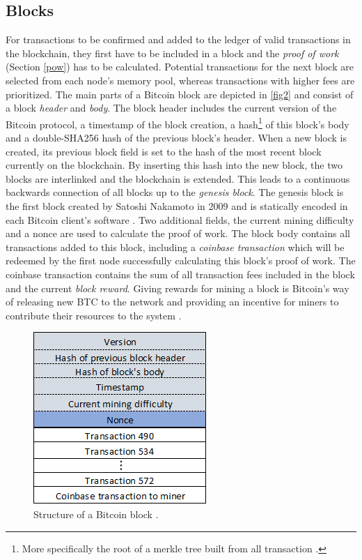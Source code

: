 \documentclass[a4paper,12pt,twoside]{report}
\begin{document}
\subsection{Blocks}
For transactions to be confirmed and added to the ledger of valid transactions in the blockchain, they first have to be included in a block and the \textit{proof of work} (Section \ref{pow}) has to be calculated. Potential transactions for the next block are selected from each node's memory pool, whereas transactions with higher fees are prioritized. The main parts of a Bitcoin block are depicted in \autoref{fig2} and consist of a block \textit{header} and \textit{body}. The block header includes the current version of the Bitcoin protocol, a timestamp of the block creation, a hash\footnote{More specifically the root of a merkle tree built from all transaction \cite{okupski2014bitcoin}.} of this block's body and a double-SHA256 hash of the previous block's header. When a new block is created, its previous block field is set to the hash of the most recent block currently on the blockchain. By inserting this hash into the new block, the two blocks are interlinked and the blockchain is extended. This leads to a continuous backwards connection of all blocks up to the \textit{genesis block}. The genesis block is the first block created by Satoshi Nakamoto in 2009 and is statically encoded in each Bitcoin client's software \cite{antonopoulos2017mastering}. Two additional fields, the current mining difficulty and a nonce are used to calculate the proof of work. The block body contains all transactions added to this block, including a \textit{coinbase transaction} which will be redeemed by the first node successfully calculating this block's proof of work. The coinbase transaction contains the sum of all transaction fees included in the block and the current \textit{block reward}. Giving rewards for mining a block is Bitcoin's way of releasing new BTC to the network and providing an incentive for miners to contribute their resources to the system \cite{okupski2014bitcoin,antonopoulos2017mastering}.
\begin{figure}[ht]
	\centering
  \includegraphics[scale=0.7]{BlockExample.png}
	\caption{Structure of a Bitcoin block \cite{DSAwithTime,okupski2014bitcoin}.}
	\label{fig2}
\end{figure}
\end{document}
